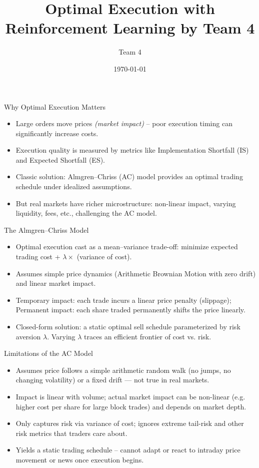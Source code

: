 \documentclass[11pt,aspectratio=169]{beamer}   %
\title{Optimal Execution with Reinforcement Learning by Team 4}
\author{Team 4}
\date{\today}
\begin{document}
	\begin{frame}[plain]
		\titlepage
	\end{frame}



\begin{frame}{Why Optimal Execution Matters}
	\begin{itemize}
		\item Large orders move prices \textit{(market impact)} – poor execution timing can significantly increase costs.
		\item Execution quality is measured by metrics like Implementation Shortfall (IS) and Expected Shortfall (ES).
		\item Classic solution: \alert{Almgren–Chriss (AC)} model provides an optimal trading schedule under idealized assumptions.
		\item But real markets have richer microstructure: non-linear impact, varying liquidity, fees, etc., challenging the AC model.
	\end{itemize}
\end{frame}

\begin{frame}{The Almgren--Chriss Model}
	\begin{itemize}
		\item Optimal execution cast as a mean–variance trade-off: minimize expected trading cost + $\lambda \times$ (variance of cost).
		\item Assumes simple price dynamics (Arithmetic Brownian Motion with zero drift) and linear market impact.
		\item Temporary impact: each trade incurs a linear price penalty (slippage); Permanent impact: each share traded permanently shifts the price linearly.
		\item Closed-form solution: a static optimal sell schedule parameterized by risk aversion $\lambda$. Varying $\lambda$ traces an efficient frontier of cost vs. risk.
	\end{itemize}
\end{frame}

\begin{frame}{Limitations of the AC Model}
	\begin{itemize}
		\item Assumes price follows a simple arithmetic random walk (no jumps, no changing volatility) or a fixed drift — not true in real markets.
		\item Impact is linear with volume; actual market impact can be non-linear (e.g. higher cost per share for large block trades) and depends on market depth.
		\item Only captures risk via variance of cost; ignores extreme tail-risk and other risk metrics that traders care about.
		\item Yields a static trading schedule – cannot adapt or react to intraday price movement or news once execution begins.
	\end{itemize}
\end{frame}
\end{document}

